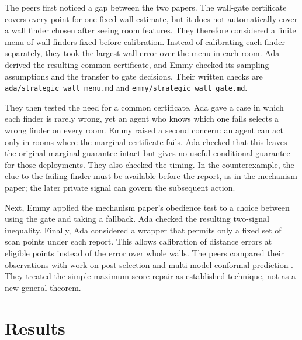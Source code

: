 \documentclass{article}
\begin{document}
The peers first noticed a gap between the two papers. The wall-gate certificate covers every point
for one fixed wall estimate, but it does not automatically cover a wall finder chosen after seeing
room features. They therefore considered a finite menu of wall finders fixed before calibration.
Instead of calibrating each finder separately, they took the largest wall error over the menu in
each room. Ada derived the resulting common certificate, and Emmy checked its sampling assumptions
and the transfer to gate decisions. Their written checks are \texttt{ada/strategic\_wall\_menu.md}
and \texttt{emmy/strategic\_wall\_gate.md}.

They then tested the need for a common certificate. Ada gave a case in which each finder is rarely
wrong, yet an agent who knows which one fails selects a wrong finder on every room. Emmy raised a
second concern: an agent can act only in rooms where the marginal certificate fails. Ada checked
that this leaves the original marginal guarantee intact but gives no useful conditional guarantee
for those deployments. They also checked the timing. In the counterexample, the clue to the failing
finder must be available before the report, as in the mechanism paper; the later private signal can
govern the subsequent action.

Next, Emmy applied the mechanism paper's obedience test to a choice between using the gate and
taking a fallback. Ada checked the resulting two-signal inequality. Finally, Ada considered a
wrapper that permits only a fixed set of scan points under each report. This allows calibration of
distance errors at eligible points instead of the error over whole walls. The peers compared their
observations with work on post-selection and multi-model conformal prediction
\cite{sarkar2023,liang2024,hajihashemi2024,bao2025}. They treated the simple maximum-score repair as
established technique, not as a new general theorem.

\section{Results}
\end{document}
